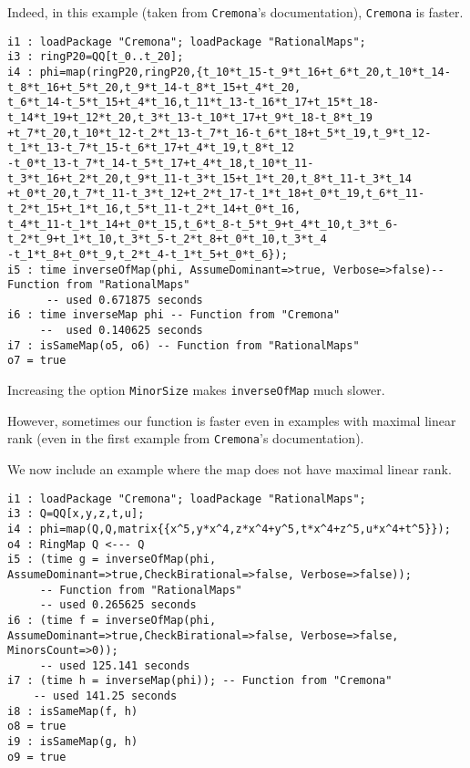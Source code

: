 \documentclass[11pt]{amsart}
\numberwithin{equation}{theorem}
\renewcommand{\:}{\colon}
\theoremstyle{theorem}
\begin{document}
{Indeed, in this example (taken from {\tt Cremona}'s documentation), {\tt Cremona} is faster.
{\scriptsize
\color{blue}\begin{verbatim}
i1 : loadPackage "Cremona"; loadPackage "RationalMaps";
i3 : ringP20=QQ[t_0..t_20];
i4 : phi=map(ringP20,ringP20,{t_10*t_15-t_9*t_16+t_6*t_20,t_10*t_14-t_8*t_16+t_5*t_20,t_9*t_14-t_8*t_15+t_4*t_20,
t_6*t_14-t_5*t_15+t_4*t_16,t_11*t_13-t_16*t_17+t_15*t_18-t_14*t_19+t_12*t_20,t_3*t_13-t_10*t_17+t_9*t_18-t_8*t_19
+t_7*t_20,t_10*t_12-t_2*t_13-t_7*t_16-t_6*t_18+t_5*t_19,t_9*t_12-t_1*t_13-t_7*t_15-t_6*t_17+t_4*t_19,t_8*t_12
-t_0*t_13-t_7*t_14-t_5*t_17+t_4*t_18,t_10*t_11-t_3*t_16+t_2*t_20,t_9*t_11-t_3*t_15+t_1*t_20,t_8*t_11-t_3*t_14
+t_0*t_20,t_7*t_11-t_3*t_12+t_2*t_17-t_1*t_18+t_0*t_19,t_6*t_11-t_2*t_15+t_1*t_16,t_5*t_11-t_2*t_14+t_0*t_16,
t_4*t_11-t_1*t_14+t_0*t_15,t_6*t_8-t_5*t_9+t_4*t_10,t_3*t_6-t_2*t_9+t_1*t_10,t_3*t_5-t_2*t_8+t_0*t_10,t_3*t_4
-t_1*t_8+t_0*t_9,t_2*t_4-t_1*t_5+t_0*t_6});
i5 : time inverseOfMap(phi, AssumeDominant=>true, Verbose=>false)-- Function from "RationalMaps"
      -- used 0.671875 seconds
i6 : time inverseMap phi -- Function from "Cremona"
     --  used 0.140625 seconds
i7 : isSameMap(o5, o6) -- Function from "RationalMaps"
o7 = true
\end{verbatim}
}
{\color{black}\normalsize}
Increasing the option {\tt MinorSize} makes {\tt inverseOfMap} much slower. 

However, sometimes our function is faster even in examples with maximal linear rank (even in the first example from {\tt Cremona}'s documentation).
}
{\color{black}\normalsize
We now include an example where the map does not have maximal linear rank.  %
}
{\scriptsize
\color{blue}\begin{verbatim}
i1 : loadPackage "Cremona"; loadPackage "RationalMaps"; 
i3 : Q=QQ[x,y,z,t,u];
i4 : phi=map(Q,Q,matrix{{x^5,y*x^4,z*x^4+y^5,t*x^4+z^5,u*x^4+t^5}});
o4 : RingMap Q <--- Q
i5 : (time g = inverseOfMap(phi, AssumeDominant=>true,CheckBirational=>false, Verbose=>false));
     -- Function from "RationalMaps"
     -- used 0.265625 seconds
i6 : (time f = inverseOfMap(phi, AssumeDominant=>true,CheckBirational=>false, Verbose=>false, MinorsCount=>0));
     -- used 125.141 seconds     
i7 : (time h = inverseMap(phi)); -- Function from "Cremona"
    -- used 141.25 seconds
i8 : isSameMap(f, h)
o8 = true
i9 : isSameMap(g, h)
o9 = true
\end{verbatim}
}
\end{document}
